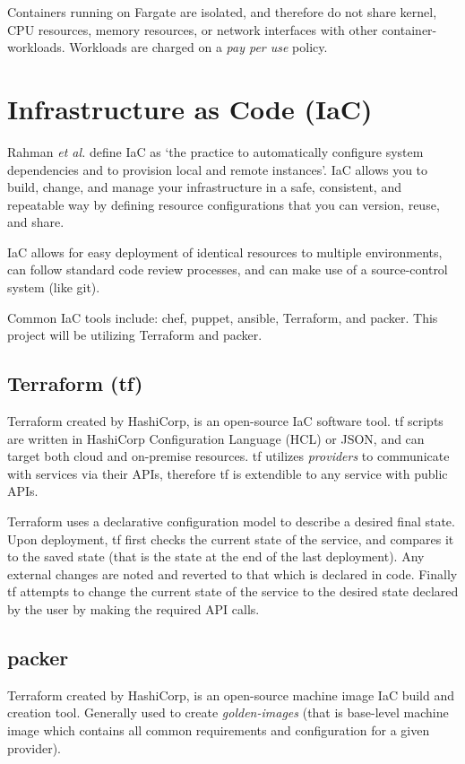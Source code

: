 Containers running on Fargate are isolated, and therefore do not share kernel, CPU resources, memory resources, or network interfaces with other container-workloads.
Workloads are charged on a \textit{pay per use} policy.

\section{Infrastructure as Code (IaC)}
Rahman \emph{et al.} define IaC as `the practice to automatically configure system dependencies and to provision local and remote instances'\cite{RAHMAN201965}.
IaC allows you to build, change, and manage your infrastructure in a safe, consistent, and repeatable way by defining resource configurations that you can version, reuse, and share\cite{hashicorp_tf_iac}.

IaC allows for easy deployment of identical resources to multiple environments, 
can follow standard code review processes, and can make use of a source-control system (like git).

Common IaC tools include: chef\cite{chef}, puppet\cite{puppet}, ansible\cite{ansible}, Terraform\cite{terraform}, and packer\cite{packer}. 
This project will be utilizing Terraform and packer.
 
\subsection{Terraform (tf)}
Terraform created by HashiCorp\cite{hashicorp}, is an open-source IaC software tool. 
tf scripts are written in HashiCorp Configuration Language (HCL) or JSON, and can target both cloud and on-premise resources.
tf utilizes \textit{providers} to communicate with services via their APIs, therefore tf is extendible to any service with public APIs. 

Terraform uses a declarative configuration model to describe a desired final state. Upon deployment, tf first checks the current state of the service,
and compares it to the saved state (that is the state at the end of the last deployment). Any external changes are noted and reverted to that which is declared in code.
Finally tf attempts to change the current state of the service to the desired state declared by the user by making the required API calls.

\subsection{packer}
Terraform created by HashiCorp\cite{hashicorp}, is an open-source machine image IaC build and creation tool. 
Generally used to create \emph{golden-images} \cite{HashiCorp_packer_docs} (that is base-level machine image which contains all common requirements and configuration for a given provider).

